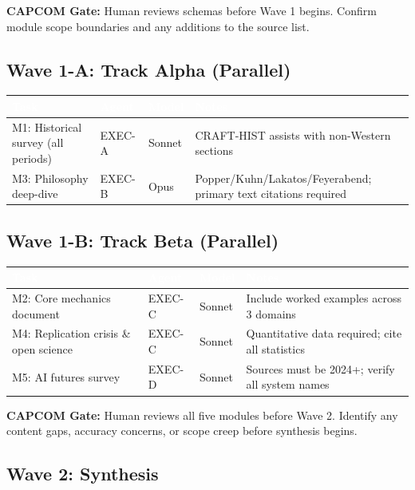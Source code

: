 \documentclass[11pt,letterpaper]{article}
\newcommand{\tableheader}[1]{\textbf{\sffamily\textcolor{white}{#1}}}
\begin{document}
\textbf{CAPCOM Gate:} Human reviews schemas before Wave 1 begins. Confirm module scope boundaries and any additions to the source list.

\subsection{Wave 1-A: Track Alpha (Parallel)}

\begin{center}
\begin{tabularx}{\textwidth}{L{3.5cm}C{2cm}C{1.5cm}X}
\toprule
{}
\tableheader{Task} & \tableheader{Agent} & \tableheader{Model} & \tableheader{Notes} \\
\midrule
M1: Historical survey (all periods) & EXEC-A & Sonnet & CRAFT-HIST assists with non-Western sections \\
M3: Philosophy deep-dive & EXEC-B & Opus & Popper/Kuhn/Lakatos/Feyerabend; primary text citations required \\
\bottomrule
\end{tabularx}
\end{center}

\subsection{Wave 1-B: Track Beta (Parallel)}

\begin{center}
\begin{tabularx}{\textwidth}{L{3.5cm}C{2cm}C{1.5cm}X}
\toprule
{}
\tableheader{Task} & \tableheader{Agent} & \tableheader{Model} & \tableheader{Notes} \\
\midrule
M2: Core mechanics document & EXEC-C & Sonnet & Include worked examples across 3 domains \\
M4: Replication crisis \& open science & EXEC-C & Sonnet & Quantitative data required; cite all statistics \\
M5: AI futures survey & EXEC-D & Sonnet & Sources must be 2024+; verify all system names \\
\bottomrule
\end{tabularx}
\end{center}

\textbf{CAPCOM Gate:} Human reviews all five modules before Wave 2. Identify any content gaps, accuracy concerns, or scope creep before synthesis begins.

\subsection{Wave 2: Synthesis}
\end{document}
